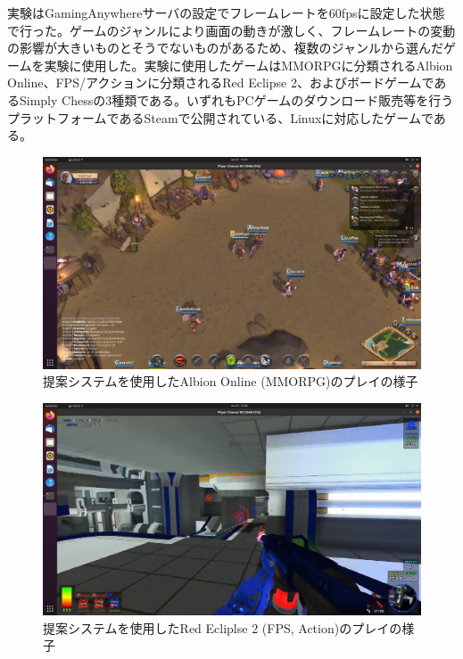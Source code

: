 実験はGamingAnywhereサーバの設定でフレームレートを60fpsに設定した状態で行った。ゲームのジャンルにより画面の動きが激しく、フレームレートの変動の影響が大きいものとそうでないものがあるため、複数のジャンルから選んだゲームを実験に使用した。実験に使用したゲームはMMORPGに分類されるAlbion Online\cite{albiononline}、FPS/アクションに分類されるRed Eclipse 2\cite{redeclipse}、およびボードゲームであるSimply Chess\cite{simplychess}の3種類である。いずれもPCゲームのダウンロード販売等を行うプラットフォームであるSteam\cite{steam}で公開されている、Linuxに対応したゲームである。

\begin{figure}[h!]
    \centering
    \includegraphics[width=\textwidth,keepaspectratio,clip]{img/screen_mmo.pdf}
    \caption{提案システムを使用したAlbion Online (MMORPG)のプレイの様子}
    \label{fig:screen_mmo}
\end{figure}

\begin{figure}[h!]
    \centering
    \includegraphics[width=\textwidth,keepaspectratio,clip]{img/screen_fps.pdf}
    \caption{提案システムを使用したRed Ecliplse 2 (FPS, Action)のプレイの様子}
    \label{fig:screen_fps}
\end{figure}

